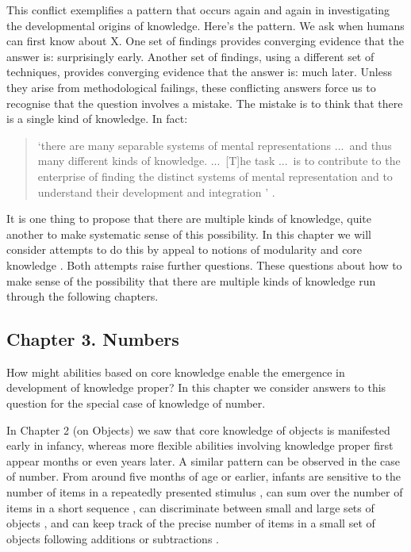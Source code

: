 \documentclass[12pt,\papersize]{extarticle}
\begin{document}
This conflict exemplifies a pattern that occurs again and again in investigating the developmental origins of knowledge. 
Here's the pattern.
We ask when humans can first know about X. 
One set of findings provides converging evidence that the answer is: surprisingly early.
Another set of findings, using a different set of techniques,  provides converging evidence that the answer is: much later. 
Unless they arise from methodological failings, these conflicting answers force us to recognise that the question involves a mistake. 
The mistake is to think that there is a single kind of knowledge. 
In fact:
%
\begin{quote}
`there are many separable systems of mental representations ...\ and thus many different kinds of knowledge. ...\ 
[T]he task ...\ is to contribute to the enterprise of finding the distinct systems of mental representation and to understand their development and integration%
'
\citep[p.\ 1522]{Hood:2000bf}.
\end{quote}
%
It is one thing to propose that there are multiple kinds of knowledge, quite another to make systematic sense of this possibility.
In this chapter we will consider attempts to do this by appeal to notions of modularity \citep{Fodor:1983dg}
and core knowledge \citep{Spelke:2007hb}. 
Both attempts raise further questions.  
These questions about how to make sense of the possibility that there are multiple kinds of knowledge 
run through the following chapters. 



\subsection{Chapter 3. Numbers}

How might abilities based on core knowledge enable the emergence in development of knowledge proper? 
In this chapter we consider answers to this question for the special case of knowledge of number.

In Chapter 2 (on Objects) we saw that core knowledge of objects is manifested early in infancy, whereas more flexible abilities involving knowledge proper first appear months or even years later. 
A similar pattern can be observed in the case of number. 
From around five months of age or earlier, infants 
are sensitive to the number of items in a repeatedly presented stimulus \citep{starkey:1980_perception}, 
can sum over the number of items in a short sequence \citep{wynn:1996_infants}, 
can discriminate between small and large sets of objects \citep{xu:2000_large}, 
and can keep track of the precise number of items in a small set of objects following additions or subtractions \citep{wynn:1992_addition}. 
\end{document}
